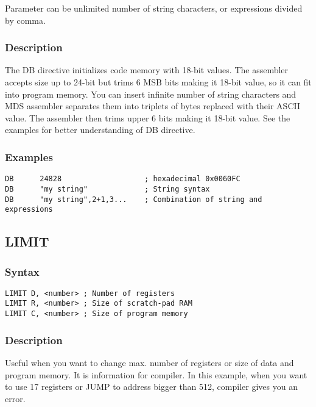             Parameter can be unlimited number of string characters, or expressions divided by comma.

        \subsubsection{Description}
            The DB directive initializes code memory with 18-bit values. The assembler accepts size up to 24-bit but trims 6 MSB bits making it 18-bit value,
            so it can fit into program memory. You can insert infinite number of string characters and MDS assembler separates them into triplets of bytes replaced
            with their ASCII value. The assembler then trims upper 6 bits making it 18-bit value.
            See the examples for better understanding of DB directive.

        \subsubsection{Examples}
            \verb'DB      24828                   ; hexadecimal 0x0060FC'\\
            \verb'DB      "my string"             ; String syntax'\\
            \verb'DB      "my string",2+1,3...    ; Combination of string and expressions'\\

    \subsection{LIMIT}
        \subsubsection{Syntax}
            \verb'LIMIT D, <number> ; Number of registers'\\
            \verb'LIMIT R, <number> ; Size of scratch-pad RAM'\\
            \verb'LIMIT C, <number> ; Size of program memory'\\

        \subsubsection{Description}
            Useful when you want to change max. number of registers or size of  data and program memory. It is information for compiler. In this example, when you want to use 17 registers or JUMP to address bigger than 512, compiler gives you an error.

